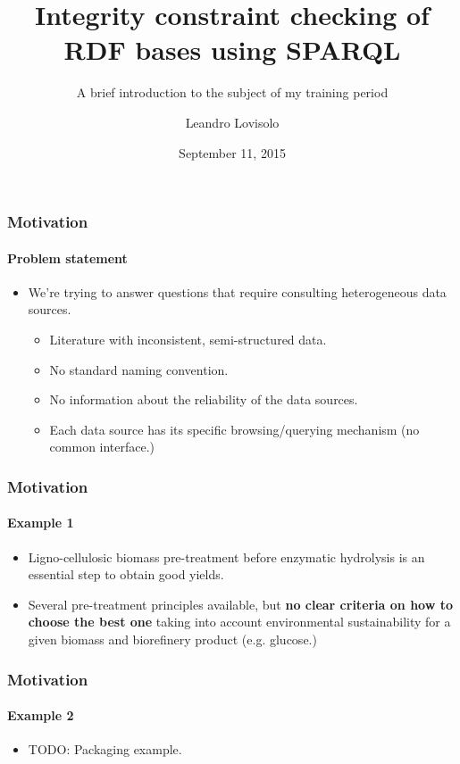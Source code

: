 \documentclass{beamer}
\title{Integrity constraint checking of RDF bases using SPARQL}
\subtitle{
  A brief introduction to the subject of my training period
}
\author{
  Leandro Lovisolo
}
\date{September 11, 2015}
\institute{
  I.N.R.A. SupAgro \\
  Montpellier, France
}
\begin{document}
\begin{frame}
  \titlepage
\end{frame}

\begin{frame}
  \frametitle{Motivation}
  \framesubtitle{Problem statement}

  \pause

  \begin{itemize}
    \item We're trying to answer questions that require consulting heterogeneous data sources.

    \pause

    \begin{itemize}
      \item Literature with inconsistent, semi-structured data.

      \pause

      \item No standard naming convention.

      \pause

      \item No information about the reliability of the data sources.

      \pause

      \item Each data source has its specific browsing/querying mechanism (no common interface.)
    \end{itemize}
  \end{itemize}
\end{frame}

\begin{frame}
  \frametitle{Motivation}
  \framesubtitle{Example 1}

  \begin{itemize}
    \item Ligno-cellulosic biomass pre-treatment before enzymatic hydrolysis is an essential step to obtain good yields.

    \pause

    \item Several pre-treatment principles available, but \textbf{no clear criteria on how to choose the best one} taking into account environmental sustainability for a given biomass and biorefinery product (e.g. glucose.)
  \end{itemize}
\end{frame}

\begin{frame}
  \frametitle{Motivation}
  \framesubtitle{Example 2}

  \begin{itemize}
    \item TODO: Packaging example.
  \end{itemize}
\end{frame}
\end{document}
